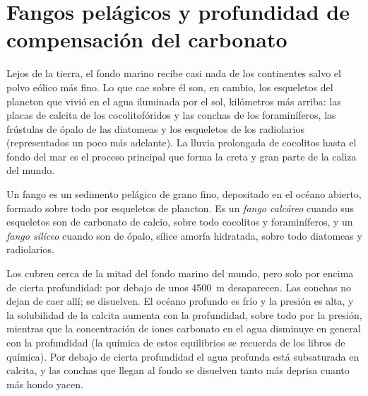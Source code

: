 \section{Fangos pelágicos y profundidad de compensación del carbonato}\label{sec:b1:chemical-biogenic-sediments:oozes}

Lejos de la tierra, el fondo marino recibe casi nada de los continentes salvo el polvo eólico más fino. Lo que cae sobre él son, en cambio, los esqueletos del plancton que vivió en
el agua iluminada por el sol, kilómetros más arriba: las placas de calcita de los cocolitofóridos y las conchas de los foraminíferos, las frústulas de ópalo de las diatomeas y los
esqueletos de los radiolarios (representados un poco más adelante). La lluvia prolongada de cocolitos hasta el fondo del mar es el proceso principal que forma la creta y gran parte
de la caliza del mundo.

\begin{definition}\label{def:b1:chemical-biogenic-sediments:ooze}
Un fango es un sedimento pelágico de grano fino, depositado en el océano abierto, formado sobre todo por esqueletos de plancton. Es un \emph{fango calcáreo} cuando sus
esqueletos son de carbonato de calcio, sobre todo cocolitos y foraminíferos, y un \emph{fango silíceo} cuando son de ópalo, sílice amorfa hidratada, sobre todo diatomeas y radiolarios.
\end{definition}

Los  cubren cerca de la mitad del fondo marino del mundo, pero solo por encima de cierta profundidad: por debajo de unos \qty{4500}{m} desaparecen. Las conchas no
dejan de caer allí; se disuelven. El océano profundo es frío y la presión es alta, y la solubilidad de la calcita aumenta con la profundidad, sobre todo por la presión, mientras que la
concentración de iones carbonato en el agua disminuye en general con la profundidad (la química de estos equilibrios se recuerda de los libros de química). Por debajo de cierta profundidad el
agua profunda está subsaturada en calcita, y las conchas que llegan al fondo se disuelven tanto más deprisa cuanto más hondo yacen.

